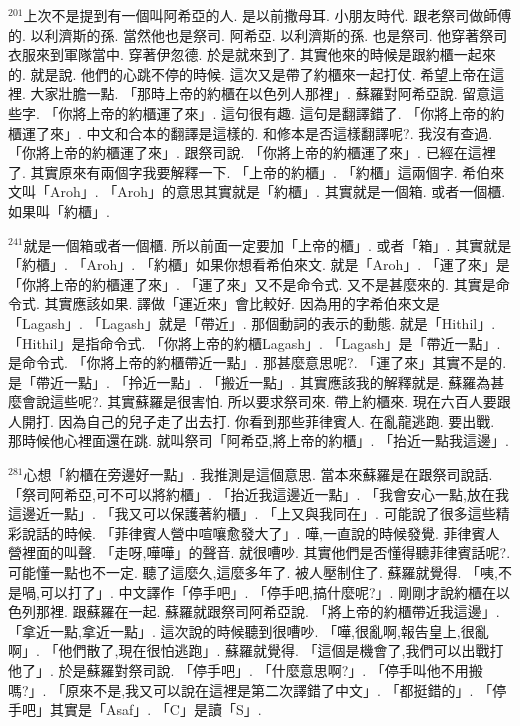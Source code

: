 \documentclass{book}
\begin{document}
$^{201}$上次不是提到有一個叫阿希亞的人.
是以前撒母耳.
小朋友時代.
跟老祭司做師傅的.
以利濟斯的孫.
當然他也是祭司.
阿希亞.
以利濟斯的孫.
也是祭司.
他穿著祭司衣服來到軍隊當中.
穿著伊忽德.
於是就來到了.
其實他來的時候是跟約櫃一起來的.
就是說.
他們的心跳不停的時候.
這次又是帶了約櫃來一起打仗.
希望上帝在這裡.
大家壯膽一點.
「那時上帝的約櫃在以色列人那裡」.
蘇羅對阿希亞說.
留意這些字.
「你將上帝的約櫃運了來」.
這句很有趣.
這句是翻譯錯了.
「你將上帝的約櫃運了來」.
中文和合本的翻譯是這樣的.
和修本是否這樣翻譯呢?.
我沒有查過.
「你將上帝的約櫃運了來」.
跟祭司說.
「你將上帝的約櫃運了來」.
已經在這裡了.
其實原來有兩個字我要解釋一下.
「上帝的約櫃」.
「約櫃」這兩個字.
希伯來文叫「Aroh」.
「Aroh」的意思其實就是「約櫃」.
其實就是一個箱.
或者一個櫃.
如果叫「約櫃」.

$^{241}$就是一個箱或者一個櫃.
所以前面一定要加「上帝的櫃」.
或者「箱」.
其實就是「約櫃」.
「Aroh」.
「約櫃」如果你想看希伯來文.
就是「Aroh」.
「運了來」是「你將上帝的約櫃運了來」.
「運了來」又不是命令式.
又不是甚麼來的.
其實是命令式.
其實應該如果.
譯做「運近來」會比較好.
因為用的字希伯來文是「Lagash」.
「Lagash」就是「帶近」.
那個動詞的表示的動態.
就是「Hithil」.
「Hithil」是指命令式.
「你將上帝的約櫃Lagash」.
「Lagash」是「帶近一點」.
是命令式.
「你將上帝的約櫃帶近一點」.
那甚麼意思呢?.
「運了來」其實不是的.
是「帶近一點」.
「拎近一點」.
「搬近一點」.
其實應該我的解釋就是.
蘇羅為甚麼會說這些呢?.
其實蘇羅是很害怕.
所以要求祭司來.
帶上約櫃來.
現在六百人要跟人開打.
因為自己的兒子走了出去打.
你看到那些菲律賓人.
在亂龍逃跑.
要出戰.
那時候他心裡面還在跳.
就叫祭司「阿希亞,將上帝的約櫃」.
「抬近一點我這邊」.

$^{281}$心想「約櫃在旁邊好一點」.
我推測是這個意思.
當本來蘇羅是在跟祭司說話.
「祭司阿希亞,可不可以將約櫃」.
「抬近我這邊近一點」.
「我會安心一點,放在我這邊近一點」.
「我又可以保護著約櫃」.
「上又與我同在」.
可能說了很多這些精彩說話的時候.
「菲律賓人營中喧嚷愈發大了」.
嘩,一直說的時候發覺.
菲律賓人營裡面的叫聲.
「走呀,嘩嘩」的聲音.
就很嘈吵.
其實他們是否懂得聽菲律賓話呢?.
可能懂一點也不一定.
聽了這麼久,這麼多年了.
被人壓制住了.
蘇羅就覺得.
「咦,不是喎,可以打了」.
中文譯作「停手吧」.
「停手吧,搞什麼呢?」.
剛剛才說約櫃在以色列那裡.
跟蘇羅在一起.
蘇羅就跟祭司阿希亞說.
「將上帝的約櫃帶近我這邊」.
「拿近一點,拿近一點」.
這次說的時候聽到很嘈吵.
「嘩,很亂啊,報告皇上,很亂啊」.
「他們散了,現在很怕逃跑」.
蘇羅就覺得.
「這個是機會了,我們可以出戰打他了」.
於是蘇羅對祭司說.
「停手吧」.
「什麼意思啊?」.
「停手叫他不用搬嗎?」.
「原來不是,我又可以說在這裡是第二次譯錯了中文」.
「都挺錯的」.
「停手吧」其實是「Asaf」.
「C」是讀「S」.
\end{document}
